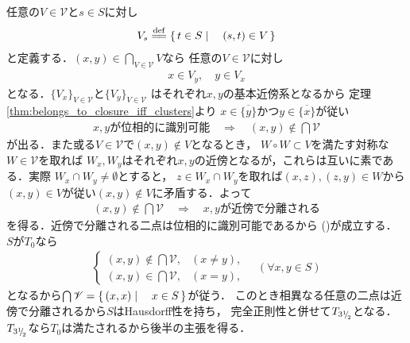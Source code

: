 	\begin{prf}
		任意の$V \in \mathscr{V}$と$s \in S$に対し
		\begin{align}
			V_s \defeq \Set{t \in S}{(s,t) \in V}
		\end{align}
		と定義する．$(x,y) \in \bigcap_{V \in \mathscr{V}}V$なら
		任意の$V \in \mathscr{V}$に対し
		\begin{align}
			x \in V_y,\quad y \in V_x
		\end{align}
		となる．$\{V_x\}_{V \in \mathscr{V}}$と$\{V_y\}_{V \in \mathscr{V}}$
		はそれぞれ$x,y$の基本近傍系となるから
		定理\ref{thm:belongs_to_closure_iff_clusters}より
		$x \in \overline{\{y\}}$かつ$y \in \overline{\{x\}}$が従い
		\begin{align}
			\mbox{$x,y$が位相的に識別可能}
			\quad \Longrightarrow \quad
			(x,y) \notin \bigcap \mathscr{V}
		\end{align}
		が出る．また或る$V \in \mathscr{V}$で$(x,y) \notin V$となるとき，
		$W \circ W \subset V$を満たす対称な$W \in \mathscr{V}$を取れば
		$W_x,W_y$はそれぞれ$x,y$の近傍となるが，これらは互いに素である．実際
		$W_x \cap W_y \neq \emptyset$とすると，
		$z \in W_x \cap W_y$を取れば$(x,z),(z,y) \in W$から
		$(x,y) \in V$が従い$(x,y) \notin V$に矛盾する．よって
		\begin{align}
			(x,y) \notin \bigcap \mathscr{V}
			\quad \Longrightarrow \quad
			\mbox{$x,y$が近傍で分離される}
		\end{align}
		を得る．近傍で分離される二点は位相的に識別可能であるから
		()が成立する．
		$S$が$T_0$なら
		\begin{align}
			\begin{cases}
				(x,y) \notin \bigcap \mathscr{V}, & (x \neq y), \\
				(x,y) \in \bigcap \mathscr{V}, & (x = y),
			\end{cases}
			\quad (\forall x,y \in S)
		\end{align}
		となるから$\bigcap \mathscr{V} = \left\{\, (x,x) \mid \quad x \in S\, \right\}$が従う．
		このとき相異なる任意の二点は近傍で分離されるから$S$はHausdorff性を持ち，
		完全正則性と併せて$T_{3{}^1{\mskip -5mu/\mskip -3mu}_2}$となる．
		$T_{3{}^1{\mskip -5mu/\mskip -3mu}_2}$なら$T_0$は満たされるから後半の主張を得る．
		\QED
	\end{prf}
	
